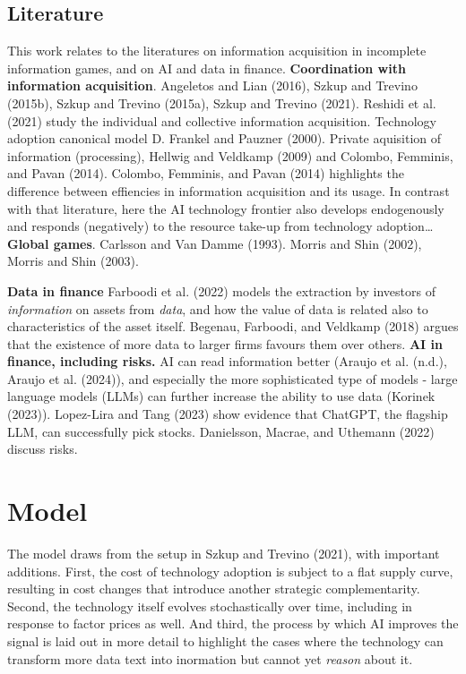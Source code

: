 \documentclass[
]{article}
\theoremstyle{plain}
\theoremstyle{remark}
\begin{document}
\subsection{Literature}\label{literature}

This work relates to the literatures on information acquisition in
incomplete information games, and on AI and data in finance.
\textbf{Coordination with information acquisition}. Angeletos and Lian
(2016), Szkup and Trevino (2015b), Szkup and Trevino (2015a), Szkup and
Trevino (2021). Reshidi et al. (2021) study the individual and
collective information acquisition. Technology adoption canonical model
D. Frankel and Pauzner (2000). Private aquisition of information
(processing), Hellwig and Veldkamp (2009) and Colombo, Femminis, and
Pavan (2014). Colombo, Femminis, and Pavan (2014) highlights the
difference between effiencies in information acquisition and its usage.
In contrast with that literature, here the AI technology frontier also
develops endogenously and responds (negatively) to the resource take-up
from technology adoption\ldots{} \textbf{Global games}. Carlsson and Van
Damme (1993). Morris and Shin (2002), Morris and Shin (2003).

\textbf{Data in finance} Farboodi et al. (2022) models the extraction by
investors of \emph{information} on assets from \emph{data}, and how the
value of data is related also to characteristics of the asset itself.
Begenau, Farboodi, and Veldkamp (2018) argues that the existence of more
data to larger firms favours them over others. \textbf{AI in finance,
including risks.} AI can read information better (Araujo et al. (n.d.),
Araujo et al. (2024)), and especially the more sophisticated type of
models - large language models (LLMs) can further increase the ability
to use data (Korinek (2023)). Lopez-Lira and Tang (2023) show evidence
that ChatGPT, the flagship LLM, can successfully pick stocks.
Danielsson, Macrae, and Uthemann (2022) discuss risks.

\section{Model}\label{model}

The model draws from the setup in Szkup and Trevino (2021), with
important additions. First, the cost of technology adoption is subject
to a flat supply curve, resulting in cost changes that introduce another
strategic complementarity. Second, the technology itself evolves
stochastically over time, including in response to factor prices as
well. And third, the process by which AI improves the signal is laid out
in more detail to highlight the cases where the technology can transform
more data text into inormation but cannot yet \emph{reason} about it.
\end{document}
